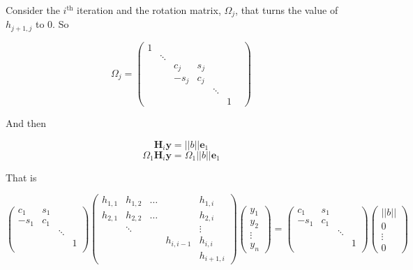 \documentclass{article}
\begin{document}
\begin{enumerate}
\begin{enumerate}
		Consider the $i^\text{th}$ iteration and the rotation matrix, $\Omega_j$, that turns the value of $h_{j+1,j}$ to 0. So 
		
		$$
		\Omega_j = 
		\begin{pmatrix}
	    1 & & &&&& \\
	      & \ddots  & &&&& \\
	      &  		& c_j & s_j  & && \\
	      & 		& -s_j & c_j & && \\
	      & 		&      &     & \ddots & \\
	      &			& 	   &     & & 1
		\end{pmatrix} 
		$$
		
		And then
		
		$$ 
		\boldsymbol{H}_i \boldsymbol{y} = ||b||\boldsymbol{e}_1
		$$
		$$
		\Omega_1 \boldsymbol{H}_i \boldsymbol{y} = \Omega_1 ||b||\boldsymbol{e}_1
		$$
		
		That is
		
		$$
		\begin{pmatrix}
	    c_1  & s_1    & & \\
	    -s_1 & c_1  & & \\
	      &  		& \ddots &  \\
	      & 		&        &  1  \\
		\end{pmatrix}
		\begin{pmatrix}
	    h_{1,1} & h_{1,2} & \dots && h_{1,i} \\
	    h_{2,1} & h_{2,2} & \dots && h_{2,i} \\
	    & \ddots & && \vdots \\
	    & && h_{i,i-1} & h_{i,i} \\
	    & & && h_{i+1,i}
		\end{pmatrix}
		\begin{pmatrix}
		y_1\\
		y_2\\
		\vdots \\
		y_n
		\end{pmatrix} = \begin{pmatrix}
	    c_1  & s_1    & & \\
	    -s_1 & c_1  & & \\
	      &  		& \ddots &  \\
	      & 		&        &  1  \\
		\end{pmatrix}
		\begin{pmatrix}
		||b||\\
		0\\
		\vdots \\
		0
		\end{pmatrix}
		$$
	

\end{enumerate}
\end{enumerate}
\end{document}
